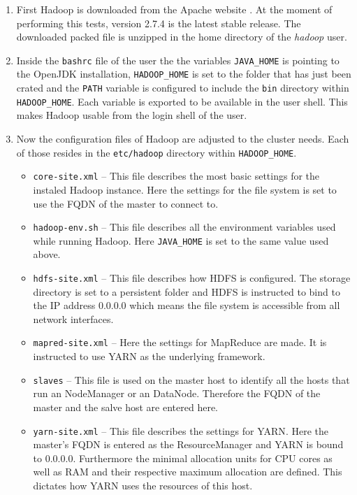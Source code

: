 \begin{enumerate}
    \item First Hadoop is downloaded from the Apache website . 
    At the moment of performing this tests, 
    version 2.7.4 is the latest stable release.
    The downloaded packed file is unzipped in the home directory of the \emph{hadoop} user.
    \item Inside the \texttt{bashrc} file of the user the the variables \texttt{JAVA\_HOME} is pointing to the OpenJDK installation,
    \texttt{HADOOP\_HOME} is set to the folder that has just been crated and the \texttt{PATH} variable is configured to include the \texttt{bin} directory within \texttt{HADOOP\_HOME}.
    Each variable is exported to be available in the user shell.
    This makes Hadoop usable from the login shell of the user.
    \item Now the configuration files of Hadoop are adjusted to the cluster needs. Each of those resides in the \texttt{etc/hadoop} directory within \texttt{HADOOP\_HOME}.
    \begin{itemize}
        \item \texttt{core-site.xml} -- This file describes the most basic settings for the instaled Hadoop instance. 
        Here the settings for the file system is set to use the \ac{FQDN} of the master to connect to.
        \item \texttt{hadoop-env.sh} -- This file describes all the environment variables used while running Hadoop. 
        Here \texttt{JAVA\_HOME} is set to the same value used above.
        \item \texttt{hdfs-site.xml} -- This file describes how \ac{HDFS} is configured. 
        The storage directory is set to a persistent folder
        and \ac{HDFS} is instructed to bind to the \ac{IP} address 0.0.0.0 
        which means the file system is accessible from all network interfaces.
        \item \texttt{mapred-site.xml} -- Here the settings for MapReduce are made. 
        It is instructed to use \ac{YARN} as the underlying framework.
        \item \texttt{slaves} -- This file is used on the master host to identify all the hosts 
        that run an NodeManager or an DataNode.
        Therefore the \acs{FQDN} of the master and the salve host are entered here.
        \item \texttt{yarn-site.xml} -- This file describes the settings for \ac{YARN}. Here the master's \ac{FQDN} is entered as the ResourceManager and \ac{YARN} is bound to 0.0.0.0. 
        Furthermore the minimal allocation units for \ac{CPU} cores 
        as well as \ac{RAM} and their respective maximum allocation are defined. 
        This dictates how \ac{YARN} uses the resources of this host.
    \end{itemize}
\end{enumerate}

